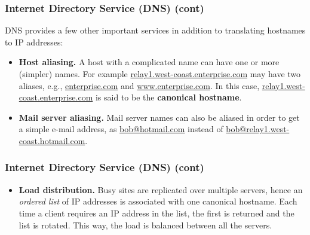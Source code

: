 %
\begin{frame}
\frametitle{Internet Directory Service (DNS) (cont)}

DNS provides a few other important services in addition to translating
hostnames to IP addresses:

\begin{itemize}

  \item \textbf{Host aliasing.} A host with a complicated name can
    have one or more (simpler) names. For example
    \url{relay1.west-coast.enterprise.com} may have two alia\-ses,
    e.g., \url{enterprise.com} and \url{www.enterprise.com}. In this
    case, \url{relay1.west-coast.enterprise.com} is said to be the
    \textbf{canonical hostname}.

  \item \textbf{Mail server aliasing.} Mail server names can also be
  aliased in order to get a simple e-mail address, as
  \url{bob@hotmail.com} instead of
  \url{bob@relay1.west-coast.hotmail.com}.

\end{itemize}

\end{frame}

%
\begin{frame}
\frametitle{Internet Directory Service (DNS) (cont)}

\begin{itemize}

  \item \textbf{Load distribution.} Busy sites are replicated over
  multiple servers, hence an \emph{ordered list} of IP addresses is
  associated with one canonical hostname. Each time a client requires
  an IP address in the list, the first is returned and the list is
  rotated. This way, the load is balanced between all the servers.

\end{itemize}

\end{frame}

